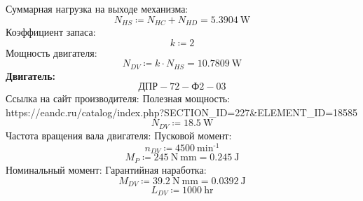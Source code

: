 \documentclass{article}
\newcommand{\defeq}{\coloneq} %
\begin{document}
\colorbox[HTML]{000000}{Суммарная нагрузка на выходе механизма:}\newline
\begin{equation*}
N_{HS} \defeq N_{HC}+N_{HD} = {5.3904 \: \mathrm{W}}
\end{equation*}
\colorbox[HTML]{000000}{Коэффициент запаса:}\newline
\begin{equation*}
k \defeq 2
\end{equation*}
\colorbox[HTML]{000000}{Мощность двигателя:}\newline
\begin{equation*}
N_{DV} \defeq k \cdot N_{HS} = {10.7809 \: \mathrm{W}}
\end{equation*}
\colorbox[HTML]{000000}{\textbf{Двигатель:}}\newline
\begin{equation*}
ДПР-72-\textit{Ф2}-03
\end{equation*}
\colorbox[HTML]{000000}{Ссылка на сайт производителя:}\newline
\colorbox[HTML]{000000}{Полезная  мощность:}\newline
\colorbox[HTML]{000000}{https://eandc.ru/catalog/index.php?SECTION\_ID=227\&ELEMENT\_ID=18585}\newline
\begin{equation*}
N_{DV} \defeq 18.5 \: \mathrm{W}
\end{equation*}
\colorbox[HTML]{000000}{Частота вращения вала двигателя:}\newline
\colorbox[HTML]{000000}{Пусковой момент:}\newline
\begin{equation*}
n_{DV} \defeq 4500 \: \mathrm{min}^{ \operatorname{-} 1}
\end{equation*}
\begin{equation*}
M_{P} \defeq 245 \: \mathrm{N} \: \mathrm{mm} = {0.245 \: \mathrm{J}}
\end{equation*}
\colorbox[HTML]{000000}{Номинальный момент:}\newline
\colorbox[HTML]{000000}{Гарантийная наработка:}\newline
\begin{equation*}
M_{DV} \defeq 39.2 \: \mathrm{N} \: \mathrm{mm} = {0.0392 \: \mathrm{J}}
\end{equation*}
\begin{equation*}
L_{DV} \defeq 1000 \: \mathrm{hr}
\end{equation*}
\end{document}
